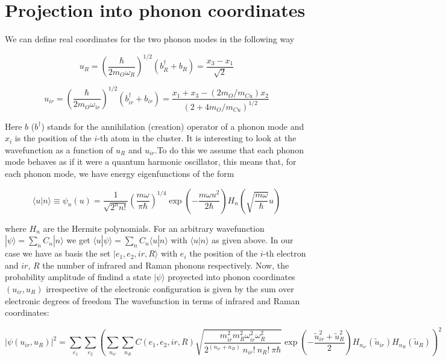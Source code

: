 \section{Projection into phonon coordinates}

We can define real coordinates for the two phonon modes in the following way\cite{MustredeLeon1992}

\begin{equation}\label{eq:uR}
u_R = \left(\frac{\hbar}{2 m_O \omega_R}\right)^{1/2}(b_R^\dagger + b_R) = \frac{x_3 - x_1}{\sqrt{2}}
\end{equation}

\begin{equation}\label{uir}
u_{ir} = \left(\frac{\hbar}{2 m_O \omega_{ir}}\right)^{1/2}(b^\dagger_{ir}+b_{ir}) = \frac{ x_1 + x_3 - ( 2 m_O/m_{Cu})x_2}{(2 + 4 m_O/m_{Cu})^{1/2}}
\end{equation}

Here $b$ ($b^\dagger$) stands for the annihilation (creation) operator of a phonon mode and $x_i$ is the position of the $i$-th atom in the cluster. It is interesting to look at the wavefunction as a function of $u_R$ and $u_{ir}$.To do this we assume that each phonon mode behaves as if it were a quantum harmonic oscillator, this means that, for each phonon mode, we have energy eigenfunctions of the form

\begin{equation}\label{eq:harmOscProj}
\langle u | n \rangle \equiv \psi_n(u) = \frac{1}{\sqrt{2^n n!}} \left(\frac{m \omega}{\pi \hbar}\right)^{1/4}\exp\left(-\frac{m \omega u^2}{2 \hbar}\right) H_n\left( \sqrt{\frac{m \omega}{\hbar}} u \right) 
\end{equation}

where $H_n$ are the Hermite polynomials. For an arbitrary wavefunction $ | \psi \rangle = \sum_n C_n |n \rangle$ we get $ \langle u | \psi \rangle = \sum_n C_n \langle u | n \rangle$ with $\langle u | n \rangle$ as given above. In our case we have as basis the set ${| e_1, e_2, ir, R \rangle}$ with $e_i$ the position of the $i$-th electron and $ir$, $R$ the number of infrared and Raman phonons respectively. Now, the probability amplitude of findind a state $|\psi\rangle$ proyected into phonon coordinates $(u_{ir},u_R)$ irrespective of the electronic configuration is given by the sum over electronic degrees of freedom The wavefunction in terms of infrared and Raman coordinates:

\begin{equation}\label{eq:phonon-coord-projection}
|\psi(u_{ir}, u_R)|^2 = \sum_{e_1}\sum_{e_2} \left(\sum_{n_{ir}} \sum_{n_R} C(e_1, e_2, ir, R) \sqrt{\frac{ m_{ir}^2 m_R^2 \omega_{ir}^2 \omega_R^2 }{2^{(n_{ir} + n_R)}\ n_{ir}!\ n_R!\ \pi \hbar}} \exp \left( - \frac{ \tilde{u}_{ir}^2 + \tilde{u}_R^2 }{2}\right) H_{n_{ir}} ( \tilde{u}_{ir}) H_{n_R}( \tilde{u}_R) \right)^2
\end{equation}

